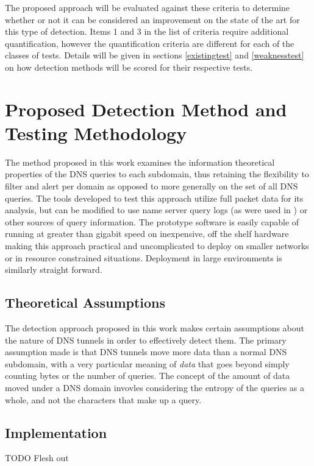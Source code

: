 \documentclass[12pt]{report}
\theoremstyle{remark}
\theoremstyle{definition}
\theoremstyle{definition}
\theoremstyle{definition}
\begin{document}
The proposed approach will be evaluated against these criteria to determine
whether or not it can be considered an improvement on the state of the art for
this type of detection. Items 1 and 3 in the list of criteria require additional
quantification, however the quantification criteria are different for each of
the classes of tests. Details will be given in sections \ref{existingtest} and
\ref{weaknesstest} on how detection methods will be scored for their respective
tests.

\chapter{Proposed Detection Method and Testing Methodology}
\label{proposed-method}

The method proposed in this work examines the information theoretical properties
of the DNS queries to each subdomain, thus retaining the flexibility to filter
and alert per domain as opposed to more generally on the set of all DNS queries.
The tools developed to test this approach utilize full packet data for its
analysis, but can be modified to use name server query logs (as were used in
\cite{Romana2007}) or other sources of query information. The prototype software
is easily capable of running at greater than gigabit speed on inexpensive, off
the shelf hardware making this approach practical and uncomplicated to deploy on
smaller networks or in resource constrained situations. Deployment in large
environments is similarly straight forward.

\section{Theoretical Assumptions} The detection approach proposed in this work
makes certain assumptions about the nature of DNS tunnels in order to
effectively detect them. The primary assumption made is that DNS tunnels move
more data than a normal DNS subdomain, with a very particular meaning of
\emph{data} that goes beyond simply counting bytes or the number of queries. The
concept of the amount of data moved under a DNS domain invovles considering the
entropy of the queries as a whole, and not the characters that make up a query.

\section{Implementation} TODO Flesh out
\end{document}
